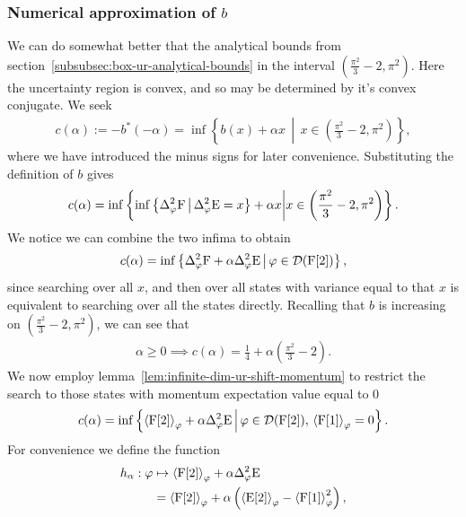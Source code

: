 \subsubsection{Numerical approximation of $b$}

We can do somewhat better that the analytical bounds from section~\ref{subsubsec:box-ur-analytical-bounds} in the interval $\left(\frac{\pi^2}{3} -2,\pi^2\right)$. Here the uncertainty region is convex, and so may be determined by it's convex conjugate. We seek
\begin{align}
  c(\alpha) := -b^*(-\alpha) = \inf \left\{b(x) + \alpha x\,\middle|\,x\in \left(\frac{\pi^2}{3} -2,\pi^2\right)\right\},
\end{align}
where we have introduced the minus signs for later convenience. Substituting the definition of $b$ gives
\begin{align}
  c(\alpha) = \inf \left\{\inf\left\{\var[\varphi]{\opf}\,\middle|\,\var[\varphi]{\ope} = x \right\} + \alpha x\middle| x\in\left(\frac{\pi^2}{3} -2,\pi^2\right)\right\}.
\end{align}
We notice we can combine the two infima to obtain
\begin{align}
  c(\alpha) = \inf\left\{\var[\varphi]{\opf} + \alpha \var[\varphi]{\ope}\,\middle|\,\varphi\in\dom{\opf[2]}\right\},
\end{align}
since searching over all $x$, and then over all states with variance equal to that $x$ is equivalent to searching over all the states directly. Recalling that $b$ is increasing on $\left(\frac{\pi^2}{3} -2,\pi^2\right)$, we can see that
\begin{align}
  \alpha \geq 0 \implies c(\alpha) = \frac{1}{4} + \alpha \left(\frac{\pi^2}{3} -2\right).
\end{align}
We now employ lemma~\ref{lem:infinite-dim-ur-shift-momentum} to restrict the search to those states with momentum expectation value equal to $0$
\begin{align}
  c(\alpha) = \inf\left\{\expe{\opf[2]}{\varphi} + \alpha \var[\varphi]{\ope}\,\middle|\,\varphi\in\dom{\opf[2]},\,\expe{\opf[1]}{\varphi} = 0\right\}.
\end{align}
For convenience we define the function
\begin{align}
  h_{\alpha} : \varphi &\mapsto \expe{\opf[2]}{\varphi} + \alpha \var[\varphi]{\ope}\\
                    &= \expe{\opf[2]}{\varphi} + \alpha\left(\expe{\ope[2]}{\varphi} - \expe{\opf[1]}{\varphi}^2\right),
\end{align}
